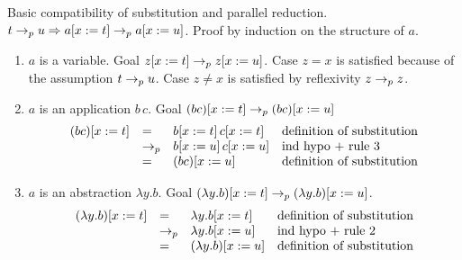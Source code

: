 \documentclass{article}
\begin{document}
\begin{lemma}
  Basic compatibility of substitution and parallel reduction.
  $t \to_{p} u \Rightarrow a[x := t] \to_{p} a[x := u]$. Proof by induction on the
  structure of $a$.
  \begin{enumerate}
  \item $a$ is a variable. Goal $z[x := t] \to_{p} z[x := u]$. Case $z=x$
    is satisfied because of the assumption $t \to_{p} u$. Case $z\ne x$ is
    satisfied by reflexivity $z \to_{p} z$.
  \item
    $a$ is an application $b\, c$.
    Goal $(b c)[x:=t] \to_{p} (b c)[x:=u]$
    $$
    \begin{array}{llll}
      (b c)[x:=t] &=& b[x:=t]\, c[x:=t] &              \text{definition of substitution}\\
                      &\to_{p} & b[x:=u]\, c[x:=u] & \text{ind hypo + rule 3} \\
                      &=& (b c)[x:=u] &                       \text{definition of substitution}
    \end{array}
    $$
  \item
    $a$ is an abstraction $\lambda y.b$.
    Goal $(\lambda y.b)[x:=t] \to_{p} (\lambda y.b)[x:=u]$.
    $$
    \begin{array}{llll}
      (\lambda y.b)[x:=t] &=& \lambda y. b[x:=t]  &\text{definition of substitution}\\
      &\to_{p} & \lambda y.b[x:=u] &\text{ind hypo + rule 2} \\
      &=& (\lambda y.b)[x:=u] & \text{definition of substitution}
    \end{array}
    $$
  \end{enumerate}
\end{lemma}
\end{document}
